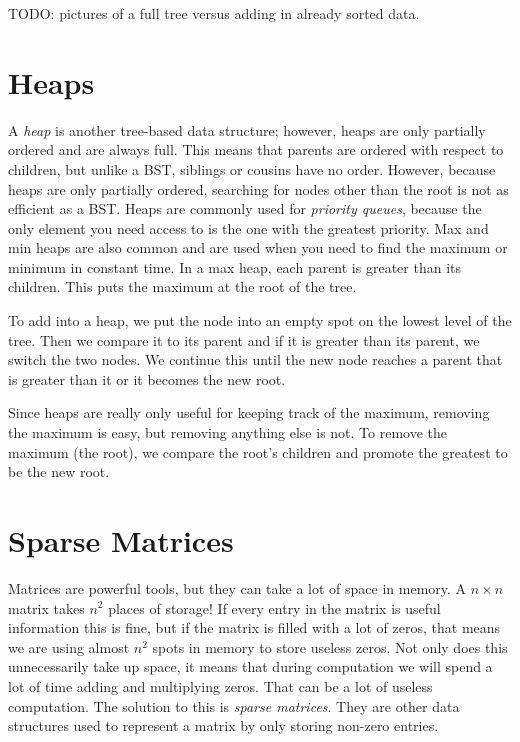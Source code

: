 TODO: pictures of a full tree versus adding in already sorted data.

\section*{Heaps}

A \emph{heap} is another tree-based data structure; however, heaps are only partially ordered and are always full.
This means that parents are ordered with respect to children, but unlike a BST, siblings or cousins have no order.
However, because heaps are only partially ordered, searching for nodes other than the root is not as efficient as a BST.
Heaps are commonly used for \emph{priority queues}, because the only element you need access to is the one with the greatest priority.
Max and min heaps are also common and are used when you need to find the maximum or minimum in constant time.
In a max heap, each parent is greater than its children.
This puts the maximum at the root of the tree.


To add into a heap, we put the node into an empty spot on the lowest level of the tree.
Then we compare it to its parent and if it is greater than its parent, we switch the two nodes.
We continue this until the new node reaches a parent that is greater than it or it becomes the new root.

Since heaps are really only useful for keeping track of the maximum, removing the maximum is easy, but removing anything else is not.
To remove the maximum (the root), we compare the root's children and promote the greatest to be the new root.


\section*{Sparse Matrices}
Matrices are powerful tools, but they can take a lot of space in memory.
A $n \times n$ matrix takes $n^2$ places of storage!
If every entry in the matrix is useful information this is fine, but if the matrix is filled with a lot of zeros, that means we are using almost $n^2$ spots in memory to store useless zeros.
Not only does this unnecessarily take up space, it means that during computation we will spend a lot of time adding and multiplying zeros.
That can be a lot of useless computation.
The solution to this is \emph{sparse matrices}.
They are other data structures used to represent a matrix by only storing non-zero entries.

